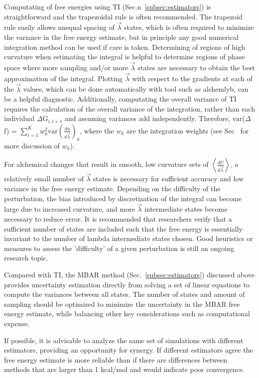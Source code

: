\documentclass[9pt,bestpractices]{livecoms}
\newcommand{\expect}[1]{\left\langle{#1}\right\rangle}
\begin{document}
Computating of free energies using TI (Sec.n~\ref{subsec:estimators}) is straightforward and the trapezoidal rule is often recommended. The trapezoid rule easily allows unequal spacing of $\vec{\lambda}$ states, which is often required to minimize the variance in the free energy estimate, but in principle any good numerical integration method can be used if care is taken.  
Determining of regions of high curvature when estimating the integral is helpful to determine regions of phase space where more sampling and/or more $\vec{\lambda}$ states are necessary to obtain the best approximation of the integral. Plotting $\vec{\lambda}$ with respect to the gradients at each of the $\vec{\lambda}$ values, which can be done automatically with tool such as alchemlyb,  can be a helpful diagnostic. 
Additionally, computating the overall variance of TI requires the calculation of the overall variance of the integration, rather than each individual $\Delta$G$_{i,i+1}$ and assuming variances add independently. 
Therefore, $\mathrm{var}$($\Delta$f) = $\sum_{i=1}^{K}w_{k}^2 \mathrm{var}(\frac{du}{d\vec{\lambda}})_{k}$, where the $w_k$ are the integration weights (see Sec~ for more discussion of $w_k$).

For alchemical changes that result in smooth, low curvature sets of $\expect{\frac{dU}{d\vec{\lambda}}}$, a relatively small number of $\vec{\lambda}$ states is necessary for sufficient accuracy and low variance in the free energy estimate. 
Depending on the difficulty of the perturbation, the bias introduced by discretization of the integral can become large due to increased curvature, and more $\vec{\lambda}$ intermediate states become necessary to reduce error.
It is recommended that researchers verify that a sufficient number of states are included such that the free energy is essentially invariant to the number of lambda intermediate states chosen. Good heuristics or measures to assess the 'difficulty' of a given perturbation is still an ongoing research topic. 

Compared with TI, the MBAR method (Sec.~\ref{subsec:estimators}) discussed above provides uncertainty estimation directly from solving a set of linear equations to compute the variances between all states. 
The number of states and amount of sampling should be optimized to minimize the uncertainty in the MBAR free energy estimate, while balancing other key considerations such as computational expense. 

If possible, it is advisable to analyze the same set of simulations with different estimators, providing an opportunity for synergy. If different estimators agree the free energy estimate is more reliable than if there are differences between methods that are larger than 1 kcal/mol and would indicate poor convergence. 
\end{document}
